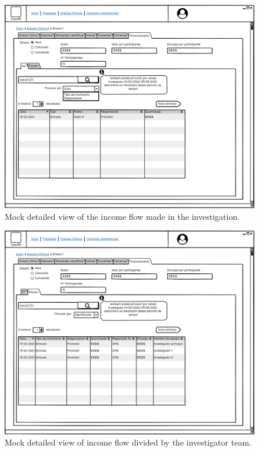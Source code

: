 \begin{figure}[H]
    \centering
    \includegraphics[scale=0.35]{Chapters/img/ensaios/ensaio-finance-ec.png}
    \caption{Mock detailed view of the income flow made in the investigation.}
    \label{fig:ensaio-finance-ec}
\end{figure}

\begin{figure}[H]
    \centering
    \includegraphics[scale=0.35]{Chapters/img/ensaios/ensaio-finance-team.png}
    \caption{Mock detailed view of income flow divided by the investigator team.}
    \label{fig:ensaio-finance-team}
\end{figure}

